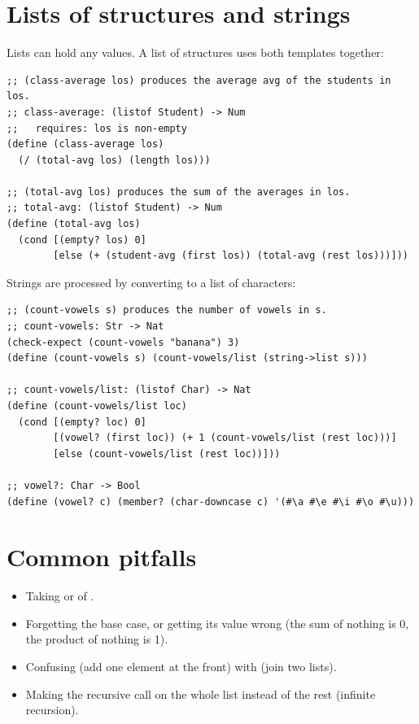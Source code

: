 \section{Lists of structures and strings}

Lists can hold any values. A list of structures uses both templates together:
\begin{lstlisting}[style=racket]
;; (class-average los) produces the average avg of the students in los.
;; class-average: (listof Student) -> Num
;;   requires: los is non-empty
(define (class-average los)
  (/ (total-avg los) (length los)))

;; (total-avg los) produces the sum of the averages in los.
;; total-avg: (listof Student) -> Num
(define (total-avg los)
  (cond [(empty? los) 0]
        [else (+ (student-avg (first los)) (total-avg (rest los)))]))
\end{lstlisting}

Strings are processed by converting to a list of characters:
\begin{lstlisting}[style=racket]
;; (count-vowels s) produces the number of vowels in s.
;; count-vowels: Str -> Nat
(check-expect (count-vowels "banana") 3)
(define (count-vowels s) (count-vowels/list (string->list s)))

;; count-vowels/list: (listof Char) -> Nat
(define (count-vowels/list loc)
  (cond [(empty? loc) 0]
        [(vowel? (first loc)) (+ 1 (count-vowels/list (rest loc)))]
        [else (count-vowels/list (rest loc))]))

;; vowel?: Char -> Bool
(define (vowel? c) (member? (char-downcase c) '(#\a #\e #\i #\o #\u)))
\end{lstlisting}

\section{Common pitfalls}
\begin{itemize}
  \item Taking  or  of .
  \item Forgetting the base case, or getting its value wrong (the sum of nothing is 0, the product of nothing is 1).
  \item Confusing  (add one element at the front) with  (join two lists).
  \item Making the recursive call on the whole list instead of the rest (infinite recursion).
\end{itemize}

